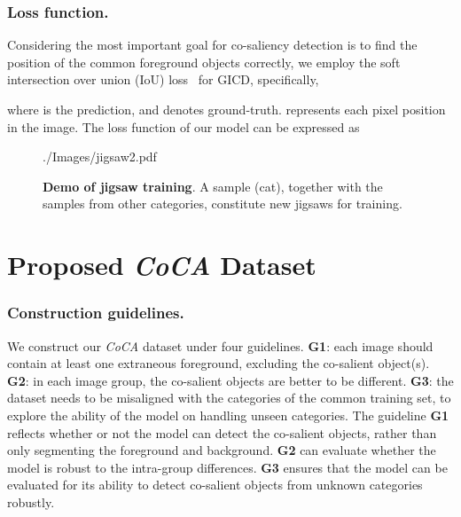 \documentclass[runningheads,orivec]{llncs}
\begin{document}
\subsubsection{Loss function.}
Considering the most important goal for co-saliency detection is to find the position of the common foreground objects correctly,
we employ the soft intersection over union (IoU) loss~\cite{li2018interactive,qin2019basnet} for GICD, specifically,

where  is the prediction, and  denotes ground-truth.  represents each pixel position in the image. 
The loss function of our model can be expressed as


\begin{figure}[t]
	\centering
	\begin{overpic}[width=0.85\columnwidth]{./Images/jigsaw2.pdf}
	\end{overpic}
	\caption{
		\textbf{Demo of jigsaw training}.
A sample (cat), together with the samples from other categories, constitute new jigsaws for training.
		}
	\label{fig:jigsaw}
\end{figure}

\section{Proposed \textsl{CoCA} Dataset}
\label{coca}
\subsubsection{Construction guidelines.}
We construct our \textit{CoCA} dataset under four guidelines.
\textbf{G1}: each image should contain at least one extraneous foreground, excluding the co-salient object(s).
\textbf{G2}: in each image group, the co-salient objects are better to be different.
\textbf{G3}: the dataset needs to be misaligned with the categories of the common training set, to explore the ability of the model on handling unseen categories.
The guideline \textbf{G1} reflects whether or not the model can detect the co-salient objects, rather than only segmenting the foreground and background.
\textbf{G2} can evaluate whether the model is robust to the intra-group differences.
\textbf{G3} ensures that the model can be evaluated for its ability to detect co-salient objects from unknown categories robustly.
\end{document}
